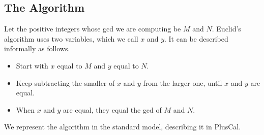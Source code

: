 \documentclass[fleqn,leqno]{article}
\begin{document}
% 
% 

\subsection{The Algorithm} \label{sec:euclid}


Let the positive integers whose gcd we are computing be $M$ and $N$.
Euclid's algorithm uses two variables, which we call $x$ and $y$.  It
can be described informally as follows.
\begin{itemize}
\item Start with $x$ equal to $M$ and $y$ equal to $N$.

\item Keep subtracting the smaller of $x$ and $y$ from the larger 
one, until $x$ and $y$ are equal.

\item When $x$ and $y$ are equal, they equal the gcd of $M$ and $N$.
\end{itemize}
We represent the algorithm in the standard model, describing it 
in PlusCal.
\end{document}
